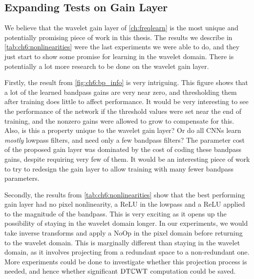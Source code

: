\subsection{Expanding Tests on Gain Layer}
We believe that the wavelet gain layer of \autoref{ch:freqlearn} is the most
unique and potentially promising piece of work in this thesis. The results we
describe in \autoref{tab:ch6:nonlinearities} 
were the last experiments we were able to do, and they just start to show some
promise for learning in the wavelet domain. There is potentially a lot more
research to be done on the wavelet gain layer.

Firstly, the result from \autoref{fig:ch6:bp_info} is very intriguing. This
figure shows that a lot of the learned bandpass gains are very near zero,
and thresholding them after training does little to affect performance. It would
be very interesting to see the performance of the network if the threshold
values were set near the end of training, and the nonzero gains were allowed to
grow to compensate for this. Also, is this a property unique to the wavelet gain
layer? Or do all CNNs learn \emph{mostly} lowpass filters, and need only a few
bandpass filters? The parameter cost of the proposed gain layer was dominated
by the cost of coding these bandpass gains, despite requiring very few of them.
It would be an interesting piece of work to try to redesign the gain layer to
allow training with many fewer bandpass parameters.

Secondly, the results from \autoref{tab:ch6:nonlinearities} show that the best
performing gain layer had no pixel nonlinearity, a ReLU in the lowpass and 
a ReLU applied to the magnitude of the bandpass. This is very exciting as it
opens up the possibility of staying in the wavelet domain longer. In our
experiments, we would take inverse transforms and apply a NoOp in the pixel
domain before returning to the wavelet domain. This is marginally different
than staying in the wavelet domain, as it involves projecting from a redundant
space to a non-redundant one. More experiments could be done to investigate
whether this projection process is needed, and hence whether significant
$\mathrm{DT}\mathbb{C}\mathrm{WT}$ computation could be saved.

